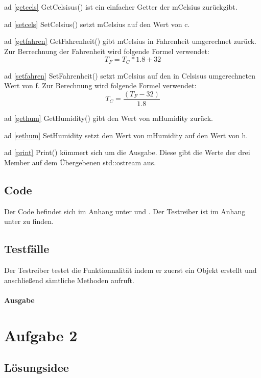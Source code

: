 \documentclass[10pt,a4paper, parskip=half]{scrartcl}
\begin{document}
ad \ref{getcels}
GetCelsisus() ist ein einfacher Getter der mCelsius zurückgibt.

ad \ref{setcels}
SetCelsius() setzt mCelsius auf den Wert von c.

ad \ref{getfahren}
GetFahrenheit() gibt mCelsius in Fahrenheit umgerechnet zurück. Zur Berrechnung der Fahrenheit wird folgende Formel verwendet:
\[ T_F = T_C * 1.8 + 32 \]

ad \ref{setfahren}
SetFahrenheit() setzt mCelsius auf den in Celsisus umgerechneten Wert von f. Zur Berechnung wird folgende Formel verwendet:
\[ T_C = \frac{(T_F - 32)}{1.8} \]

ad \ref{gethum}
GetHumidity() gibt den Wert von mHumidity zurück.

ad \ref{sethum}
SetHumidity setzt den Wert von mHumidity auf den Wert von h.

ad \ref{print}
Print() kümmert sich um die Ausgabe. Diese gibt die Werte der drei Member auf dem Übergebenen std::ostream aus.

\subsection{Code}

Der Code befindet sich im Anhang unter  und .
Der Testreiber ist im Anhang unter  zu finden.

\subsection{Testf\"{a}lle}

Der Testreiber testet die Funktionnalität indem er zuerst ein Objekt erstellt und anschließend sämtliche Methoden aufruft.
\paragraph{Ausgabe}



\newpage

\section{Aufgabe 2}

\subsection{Lösungsidee}
\end{document}
